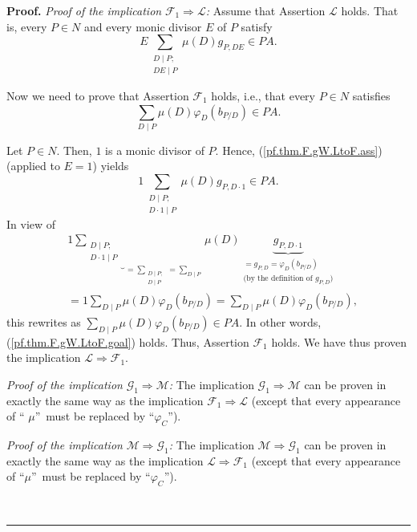 \documentclass[numbers=enddot,12pt,final,onecolumn,notitlepage]{scrartcl}%
\theoremstyle{definition}
\newenvironment{proof}[1][Proof]{\noindent\textbf{#1.} }{\ \rule{0.5em}{0.5em}}
\let\sumnonlimits\sum
\renewcommand{\sum}{\sumnonlimits\limits}
\begin{document}
\begin{proof}
\textit{Proof of the implication }$\mathcal{F}_{1}\Longrightarrow\mathcal{L}%
$\textit{:} Assume that Assertion $\mathcal{L}$ holds. That is, every $P\in N$
and every monic divisor $E$ of $P$ satisfy%
\begin{equation}
E\sum_{\substack{D\mid P;\\DE\mid P}}\mu\left(  D\right)  g_{P,DE}\in PA.
\label{pf.thm.F.gW.LtoF.ass}%
\end{equation}


Now we need to prove that Assertion $\mathcal{F}_{1}$ holds, i.e., that every
$P\in N$ satisfies%
\begin{equation}
\sum_{D\mid P}\mu\left(  D\right)  \varphi_{D}\left(  b_{P/D}\right)  \in PA.
\label{pf.thm.F.gW.LtoF.goal}%
\end{equation}


Let $P\in N$. Then, $1$ is a monic divisor of $P$. Hence,
(\ref{pf.thm.F.gW.LtoF.ass}) (applied to $E=1$) yields%
\[
1\sum_{\substack{D\mid P;\\D\cdot1\mid P}}\mu\left(  D\right)  g_{P,D\cdot
1}\in PA.
\]
In view of%
\begin{align*}
&  1\underbrace{\sum_{\substack{D\mid P;\\D\cdot1\mid P}}}_{=\sum
_{\substack{D\mid P;\\D\mid P}}=\sum_{D\mid P}}\mu\left(  D\right)
\underbrace{g_{P,D\cdot1}}_{\substack{=g_{P,D}=\varphi_{D}\left(
b_{P/D}\right)  \\\text{(by the definition of }g_{P,D}\text{)}}}\\
&  =1\sum_{D\mid P}\mu\left(  D\right)  \varphi_{D}\left(  b_{P/D}\right)
=\sum_{D\mid P}\mu\left(  D\right)  \varphi_{D}\left(  b_{P/D}\right)  ,
\end{align*}
this rewrites as $\sum_{D\mid P}\mu\left(  D\right)  \varphi_{D}\left(
b_{P/D}\right)  \in PA$. In other words, (\ref{pf.thm.F.gW.LtoF.goal}) holds.
Thus, Assertion $\mathcal{F}_{1}$ holds. We have thus proven the implication
$\mathcal{L}\Longrightarrow\mathcal{F}_{1}$.

\textit{Proof of the implication }$\mathcal{G}_{1}\Longrightarrow\mathcal{M}%
$\textit{:} The implication $\mathcal{G}_{1}\Longrightarrow\mathcal{M}$ can be
proven in exactly the same way as the implication $\mathcal{F}_{1}%
\Longrightarrow\mathcal{L}$ (except that every appearance of \textquotedblleft%
$\mu$\textquotedblright\ must be replaced by \textquotedblleft$\varphi_{C}%
$\textquotedblright).

\textit{Proof of the implication }$\mathcal{M}\Longrightarrow\mathcal{G}_{1}%
$\textit{:} The implication $\mathcal{M}\Longrightarrow\mathcal{G}_{1}$ can be
proven in exactly the same way as the implication $\mathcal{L}\Longrightarrow
\mathcal{F}_{1}$ (except that every appearance of \textquotedblleft$\mu
$\textquotedblright\ must be replaced by \textquotedblleft$\varphi_{C}%
$\textquotedblright).


\end{proof}
\end{document}
